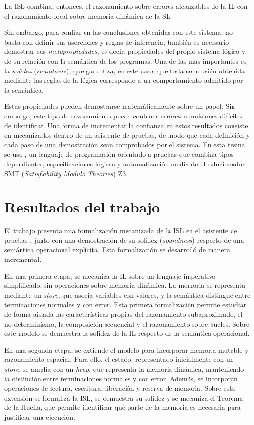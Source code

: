\documentclass[a4paper,	11pt]{report}
\begin{document}
La ISL combina, entonces, el razonamiento sobre errores alcanzables de la IL
con el razonamiento local sobre memoria dinámica de la SL.

Sin embargo, para confiar en las conclusiones obtenidas con este sistema,
no basta con definir sus aserciones y reglas de inferencia;
también es necesario demostrar sus \emph{metapropiedades}, es decir,
propiedades del propio sistema lógico y de su relación con la semántica de los programas.
Una de las más importantes es la \emph{solidez} (\emph{soundness}),
que garantiza, en este caso, que toda conclusión obtenida mediante las reglas de la lógica corresponde a
un comportamiento admitido por la semántica.

Estas propiedades pueden demostrarse matemáticamente sobre un papel.
Sin embargo, este tipo de razonamiento puede contener errores u omisiones difíciles de identificar.
Una forma de incrementar la confianza en estos resultados consiste en mecanizarlos dentro de un asistente de pruebas,
de modo que cada definición y cada paso de una demostración sean comprobados por el sistema.
En esta tesina se usa \fstar{}, un lenguaje de programación orientado a pruebas que combina tipos dependientes,
especificaciones lógicas y automatización mediante el solucionador SMT (\emph{Satisfiability Modulo Theories}) Z3.

\section{Resultados del trabajo}
\label{sec:resultados}
El trabajo presenta una formalización mecanizada de la ISL en el asistente de pruebas \fstar{},
junto con una demostración de su solidez (\emph{soundness}) respecto de una semántica operacional explícita.
Esta formalización se desarrolló de manera incremental.

En una primera etapa, se mecaniza la IL sobre un lenguaje imperativo simplificado,
sin operaciones sobre memoria dinámica.
La memoria se representa mediante un \emph{store},
que asocia variables con valores,
y la semántica distingue entre terminaciones normales y con error.
Esta primera formalización permite estudiar de forma aislada las características propias del razonamiento subaproximado,
el no determinismo, la composición secuencial y el razonamiento sobre bucles.
Sobre este modelo se demuestra la solidez de la IL respecto de la semántica operacional.

En una segunda etapa, se extiende el modelo para incorporar memoria mutable y razonamiento espacial.
Para ello, el estado, representado inicialmente con un \emph{store},
se amplía con un \emph{heap}, 
que representa la memoria dinámica,
manteniendo la distinción entre terminaciones normales y con error.
Además, se incorporan operaciones de lectura, escritura, liberación y reserva de memoria.
Sobre esta extensión se formaliza la ISL,
se demuestra su solidez y se mecaniza el Teorema de la Huella,
que permite identificar qué parte de la memoria es necesaria para justificar una ejecución.
\end{document}
